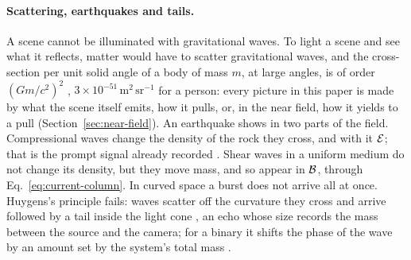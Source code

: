 \paragraph{Scattering, earthquakes and tails.} A scene cannot be illuminated
with gravitational waves. To light a scene and see what it reflects, matter would have to scatter
gravitational waves, and the cross-section per unit solid angle of a body of mass $m$, at large angles, is of order
$(Gm/c^2)^2$ \cite{Peters1976}, $3\times10^{-51}\,\mathrm{m^2\,sr^{-1}}$ for a person: every
picture in this paper is made by what the scene itself emits, how it pulls, or,
in the near field, how it yields to a pull (Section~\ref{sec:near-field}).
An earthquake shows in two parts of the field. Compressional waves change
the density of the rock they cross, and with it $\mathcal{E}$; that is the prompt
signal already recorded \cite{Vallee2017}. Shear waves in a uniform medium do
not change its density, but they move mass, and so appear in $\mathcal{B}$, through
Eq.~\eqref{eq:current-column}. In curved space a burst does not arrive all at once.
Huygens's principle fails: waves scatter off the curvature they cross and
arrive followed by a tail inside the light cone \cite{DeWitt1960}, an echo whose
size records the mass between the source and the camera; for a binary it shifts
the phase of the wave by an amount set by the system's total mass
\cite{BlanchetDamour1992}.
